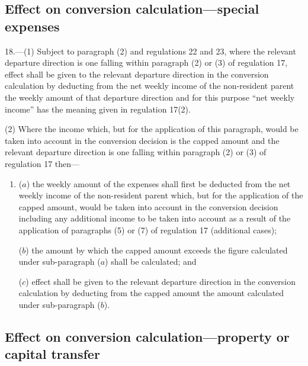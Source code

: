 \documentclass[12pt,a4paper]{article}
\begin{document}

\subsection[18. Effect on conversion calculation—special expenses]{Effect on conversion calculation—special expenses}

18.---(1)  Subject to paragraph (2) and regulations 22 and 23, where the relevant departure direction is one falling within paragraph (2) or (3) of regulation 17, effect shall be given to the relevant departure direction in the conversion calculation by deducting from the net weekly income of the non-resident parent the weekly amount of that departure direction and for this purpose “net weekly income” has the meaning given in regulation 17(2).

(2) Where the income which, but for the application of this paragraph, would be taken into account in the conversion decision is the capped amount and the relevant departure direction is one falling within paragraph (2) or (3) of regulation 17 then—
\begin{enumerate}\item[]
($a$) the weekly amount of the expenses shall first be deducted from the net weekly income of the non-resident parent which, but for the application of the capped amount, would be taken into account in the conversion decision including any additional income to be taken into account as a result of the application of paragraphs (5) or (7) of regulation 17 (additional cases);

($b$) the amount by which the capped amount exceeds the figure calculated under sub-paragraph ($a$)  shall be calculated; and

($c$) effect shall be given to the relevant departure direction in the conversion calculation by deducting from the capped amount the amount calculated under sub-paragraph ($b$).
\end{enumerate}

\subsection[19. Effect on conversion calculation—property or capital transfer]{Effect on conversion calculation—property or capital transfer}
\end{document}
